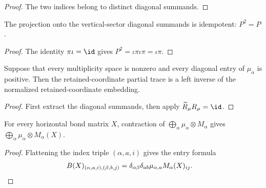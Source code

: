 \begin{proof}\leanok
    The two indices belong to distinct diagonal summands.
\end{proof}

\begin{lemma}
    \label{lem:mpdo_retained_vertical_sector_projection_idempotent}
    \leanok
    The projection onto the vertical-sector diagonal summands is idempotent:
    $P^2=P$.
\end{lemma}

\begin{proof}\leanok
    The identity $\pi\iota=\id$ gives
    $P^2=\iota\pi\iota\pi=\iota\pi$.
\end{proof}

\begin{lemma}
    \label{lem:mpdo_retained_vertical_sector_retraction}
    \leanok
    Suppose that every multiplicity space is nonzero and every diagonal entry
    of $\mu_\alpha$ is positive. Then the retained-coordinate partial trace
    is a left inverse of the normalized retained-coordinate embedding.
\end{lemma}

\begin{proof}\leanok
    First extract the diagonal summands, then apply
    $\widetilde R_\mu R_\mu=\id$.
\end{proof}

\begin{lemma}
    \label{lem:mpdo_retained_vertical_weighted_contraction}
    \leanok
    For every horizontal bond matrix $X$, contraction of
    $\bigoplus_\alpha\mu_\alpha\otimes M_\alpha$ gives
    $\bigoplus_\alpha\mu_\alpha\otimes M_\alpha(X)$.
\end{lemma}

\begin{proof}\leanok
    Flattening the index triple $(\alpha,a,i)$ gives the entry formula
    \begin{align}
        B(X)_{(\alpha,a,i),(\beta,b,j)}
         & =\delta_{\alpha\beta}\delta_{ab}
        \mu_{\alpha,a}M_\alpha(X)_{ij}.
        \notag
    \end{align}
\end{proof}

